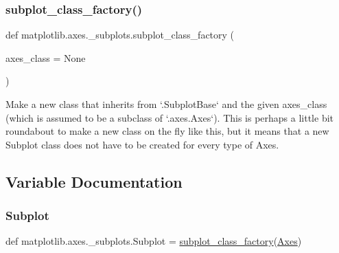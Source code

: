 \subsubsection{\texorpdfstring{subplot\+\_\+class\+\_\+factory()}{subplot\_class\_factory()}}
{\footnotesize\ttfamily def matplotlib.\+axes.\+\_\+subplots.\+subplot\+\_\+class\+\_\+factory (\begin{DoxyParamCaption}\item[{}]{axes\+\_\+class = {\ttfamily None} }\end{DoxyParamCaption})}

\begin{DoxyVerb}Make a new class that inherits from `.SubplotBase` and the
given axes_class (which is assumed to be a subclass of `.axes.Axes`).
This is perhaps a little bit roundabout to make a new class on
the fly like this, but it means that a new Subplot class does
not have to be created for every type of Axes.
\end{DoxyVerb}
 

\subsection{Variable Documentation}
\mbox{\label{namespacematplotlib_1_1axes_1_1__subplots_a07ab982b24a7360954cc660162a70e2f}} 
\subsubsection{\texorpdfstring{Subplot}{Subplot}}
{\footnotesize\ttfamily def matplotlib.\+axes.\+\_\+subplots.\+Subplot = \hyperlink{namespacematplotlib_1_1axes_1_1__subplots_ab66c3fe9ccac642abb803b6db11604ca}{subplot\+\_\+class\+\_\+factory}(\hyperlink{classmatplotlib_1_1axes_1_1__axes_1_1Axes}{Axes})}

